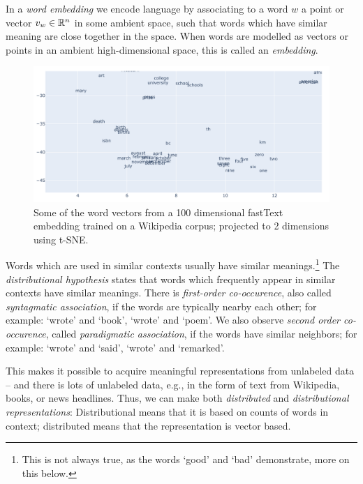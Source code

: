 \documentclass[11pt, a4paper]{amsart}
\begin{document}
In a \emph{word embedding} we encode language by associating to a word $w$ a point or vector $v_{w} \in \mathbb{R}^{n}$ in some ambient space, such that words which have similar meaning are close together in the space.
When words are modelled as vectors or points in an ambient high-dimensional space, this is called an \emph{embedding}.

\begin{figure}[H]
    \centering
    \includegraphics[width=\linewidth]{pictures/fastText_tSNE_screenshot.png}
    \caption{Some of the word vectors from a 100 dimensional fastText embedding trained on a Wikipedia corpus; projected to 2 dimensions using t-SNE.}
    \label{fig:fastText_tSNE}
\end{figure}

Words which are used in similar contexts usually have similar meanings.\footnote{This is not always true, as the words `good' and `bad' demonstrate, more on this below.}
The \emph{distributional hypothesis} states that words which frequently appear in similar contexts have similar meanings.
There is \emph{first-order co-occurence}, also called \emph{syntagmatic association}, if the words are typically nearby each other; for example: `wrote' and `book', `wrote' and `poem'.
We also observe \emph{second order co-occurence}, called \emph{paradigmatic association}, if the words have similar neighbors; for example: `wrote' and `said', `wrote' and `remarked'.

This makes it possible to acquire meaningful representations from unlabeled data -- and there is lots of unlabeled data, e.g., in the form of text from Wikipedia, books, or news headlines.
Thus, we can make both \emph{distributed} and \emph{distributional representations}:
Distributional means that it is based on counts of words in context;
distributed means that the representation is vector based.
\end{document}
